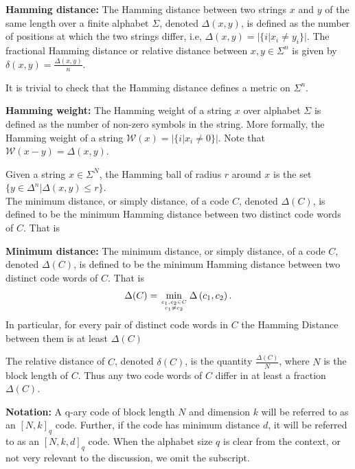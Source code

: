 \begin{definition}
 \textbf{Hamming distance:} The Hamming distance between two strings $x$ and $y$ of the same length over a finite alphabet $\Sigma$, denoted $\Delta(x,y)$, is defined as the number of positions at which the two strings differ, i.e, $\Delta(x,y) = |\{i| x_i \neq y_i\}|$. The fractional Hamming distance or relative distance between $x,y\in \Sigma^n$ is given by $\delta(x,y) = \frac{\Delta(x,y)}{n}$.
 \end{definition}
It is trivial to check that the Hamming distance defines a metric on $\Sigma^n$.
\begin{definition}
\textbf{Hamming weight:} The Hamming weight of a string $x$ over alphabet $\Sigma$ is defined as the number of non-zero symbols in the string. More formally, the Hamming weight of a string $\mathcal{W}(x) = |\{i| x_i \neq 0\}|$. Note that $\mathcal{W}(x-y) = \Delta(x,y)$.
\end{definition}
Given a string $x\in\Sigma^{N}$, the Hamming ball of radius $r$ around $x$ is the set $\{y\in\Delta^n | \Delta(x,y)\leq r\}$.\\
The minimum distance, or simply distance, of a code $C$, denoted $\Delta(C)$, is defined to be the minimum Hamming distance between two distinct code words of $C$. That is
\begin{definition}
\textbf{Minimum distance:} The minimum distance, or simply distance, of a code $C$, denoted $\Delta(C)$, is defined to be the minimum Hamming distance between two distinct code words of $C$. That is
\begin{equation}
\Delta(C)=\min _{c_{1}, c_{2} \in C \atop c_{1} \neq c_{2}} \Delta\left(c_{1}, c_{2}\right).
\end{equation}
In particular, for every pair of distinct code words in $C$ the Hamming Distance between them is at least $\Delta(C)$
\end{definition}

The relative distance of $C$, denoted $\delta(C)$, is the quantity $\frac{\Delta(C)}{N}$, where $N$ is the block length of $C$. Thus any two code words of $C$ differ in at least a fraction $\Delta(C)$.
\begin{definition}
\textbf{Notation:} A q-ary code of block length $N$ and dimension $k$ will be referred to as an $[N,k]_q$ code. Further, if the code has minimum distance $d$, it will be referred to as an $[N,k,d]_q$ code. When the alphabet size $q$ is clear from the context, or not very relevant to the discussion, we omit the subscript.
\end{definition}

